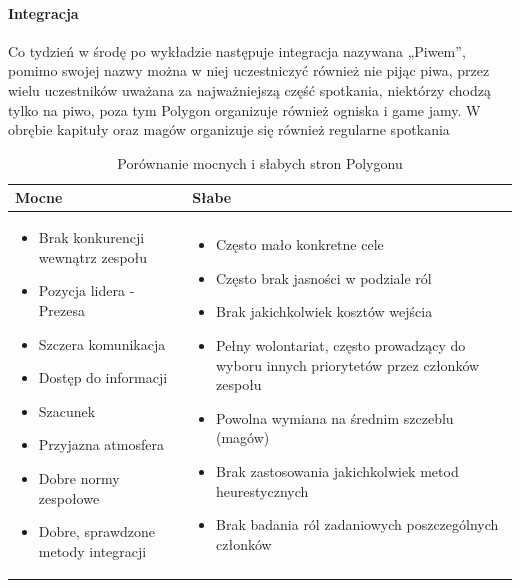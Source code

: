 \documentclass{article}[12pt]
\begin{document}
\paragraph{Integracja}
Co tydzień w środę po wykładzie następuje integracja nazywana „Piwem”, pomimo swojej nazwy można w niej uczestniczyć również nie pijąc piwa, przez wielu uczestników uważana za najważniejszą część spotkania, niektórzy chodzą tylko na piwo, poza tym Polygon organizuje również ogniska i game jamy. W obrębie kapituły oraz magów organizuje się również regularne spotkania
\begin{table}[h]
\caption{Porównanie mocnych i słabych stron Polygonu}
\centering
\begin{tabularx}{\textwidth}{|X|X|}
\hline
\cellcolor{lightgreen}\textbf{Mocne} & \cellcolor{lightred}\textbf{Słabe} \\ \hline
\begin{itemize}[leftmargin=*]
\item Brak konkurencji wewnątrz zespołu
\item Pozycja lidera - Prezesa
\item Szczera komunikacja
\item Dostęp do informacji
\item Szacunek
\item Przyjazna atmosfera
\item Dobre normy zespołowe
\item Dobre, sprawdzone metody integracji
\end{itemize} & 
\begin{itemize}[leftmargin=*]
\item Często mało konkretne cele
\item Często brak jasności w podziale ról
\item Brak jakichkolwiek kosztów wejścia
\item Pełny wolontariat, często prowadzący do wyboru innych priorytetów przez członków zespołu
\item Powolna wymiana na średnim szczeblu (magów)
\item Brak zastosowania jakichkolwiek metod heurestycznych
\item Brak badania ról zadaniowych poszczególnych członków
\end{itemize} \\ \hline
\end{tabularx}
\label{table:comparison}
\end{table}
\end{document}
